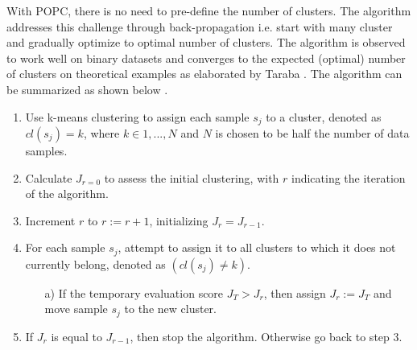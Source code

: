 \documentclass[AMA,Times1COL]{WileyNJDv5} %
\begin{document}
	With POPC, there is no need to pre-define the number of clusters. The algorithm addresses this challenge through back-propagation i.e. start with many cluster and gradually optimize to optimal number of clusters. The algorithm is observed to work well on binary datasets and converges to the expected (optimal) number of clusters on theoretical examples as elaborated by Taraba \cite{taraba2017clustering}. The algorithm can be summarized as shown below \cite{taraba2017clustering}.
	\begin{enumerate}
		\item Use k-means clustering to assign each sample $s_j$ to a cluster, denoted as $cl(s_j) = k$, where $k \in {1, ..., N}$ and $N$ is chosen to be half the number of data samples.
		\item Calculate $J_{r=0}$ to assess the initial clustering, with $r$ indicating the iteration of the algorithm.
		\item Increment $r$ to $r := r + 1$, initializing $J_r = J_{r-1}$.
		\item For each sample $s_j$, attempt to assign it to all clusters to which it does not currently belong, denoted as $(cl(s_j) \neq k)$.
		\begin{enumerate}
			\item [a)] If the temporary evaluation score $J_T > J_r$, then assign $J_r := J_T$ and move sample $s_j$ to the new cluster. 
		\end{enumerate}
		\item If $J_r$ is equal to $J_{r-1}$, then stop the algorithm. Otherwise go back to step 3.
	\end{enumerate}
	
\end{document}
